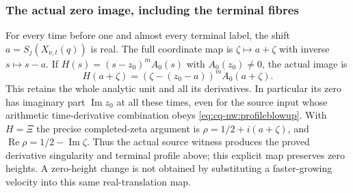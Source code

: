 \subsubsection{The actual zero image, including the terminal fibres}

For every time before one and almost every terminal label, the shift
$a=S_j(X_{\nu,t}(q))$ is real. The full coordinate map is
$\zeta\mapsto a+\zeta$ with inverse $s\mapsto s-a$. If
$H(s)=(s-z_0)^mA_0(s)$ with $A_0(z_0)\ne0$, the actual image is
\[
 H(a+\zeta)=(\zeta-(z_0-a))^mA_0(a+\zeta).
\]
This retains the whole analytic unit and all its derivatives. In
particular its zero has imaginary part $\operatorname{Im}z_0$ at all
these times, even for the source input whose arithmetic time-derivative
combination obeys \eqref{eq:cq-nw:profileblowup}. With $H=\Xi$ the precise
completed-zeta argument is $\rho=1/2+i(a+\zeta)$, and
$\operatorname{Re}\rho=1/2-\operatorname{Im}\zeta$. Thus the actual
source witness produces the proved derivative singularity and terminal
profile above; this explicit map preserves zero heights. A zero-height
change is not obtained by substituting a faster-growing velocity into
this same real-translation map.
